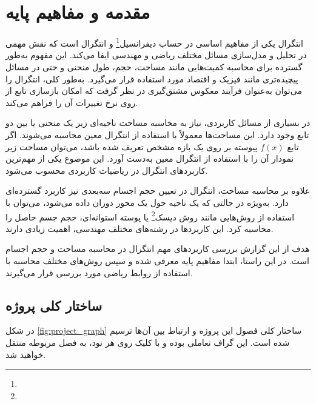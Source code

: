 \hypertarget{target:chap1}{}\chapter{مقدمه و مفاهیم پایه}\label{chap:intro}
انتگرال یکی از مفاهیم اساسی در حساب دیفرانسیل\footnote{} و انتگرال است که نقش مهمی در تحلیل و مدل‌سازی مسائل مختلف ریاضی و مهندسی ایفا می‌کند. این مفهوم به‌طور گسترده برای محاسبه کمیت‌هایی مانند مساحت، حجم، طول منحنی و حتی در مسائل پیچیده‌تری مانند فیزیک و اقتصاد مورد استفاده قرار می‌گیرد. به‌طور کلی، انتگرال را می‌توان به‌عنوان فرآیند معکوس مشتق‌گیری در نظر گرفت که امکان بازسازی تابع از روی نرخ تغییرات آن را فراهم می‌کند.

در بسیاری از مسائل کاربردی، نیاز به محاسبه مساحت ناحیه‌ای زیر یک منحنی یا بین دو تابع وجود دارد. این مساحت‌ها معمولاً با استفاده از انتگرال معین محاسبه می‌شوند. اگر تابع $f(x)$ پیوسته بر روی یک بازه مشخص تعریف شده باشد، می‌توان مساحت زیر نمودار آن را با استفاده از انتگرال معین به‌دست آورد. این موضوع یکی از مهم‌ترین کاربردهای انتگرال در ریاضیات کاربردی محسوب می‌شود.

علاوه بر محاسبه مساحت، انتگرال در تعیین حجم اجسام سه‌بعدی نیز کاربرد گسترده‌ای دارد. به‌ویژه در حالتی که یک ناحیه حول یک محور دوران داده می‌شود، می‌توان با استفاده از روش‌هایی مانند روش دیسک\footnote{} یا پوسته استوانه‌ای، حجم جسم حاصل را محاسبه کرد. این کاربردها در رشته‌های مختلف مهندسی، اهمیت زیادی دارند.

هدف از این گزارش بررسی کاربردهای مهم انتگرال در محاسبه مساحت و حجم اجسام است. در این راستا، ابتدا مفاهیم پایه معرفی شده و سپس روش‌های مختلف محاسبه با استفاده از روابط ریاضی مورد بررسی قرار می‌گیرند.

\section{ساختار کلی پروژه}
در شکل \ref{fig:project_graph} ساختار کلی فصول این پروژه و ارتباط بین آن‌ها ترسیم شده است. این گراف تعاملی بوده و با کلیک روی هر نود، به فصل مربوطه منتقل خواهید شد.


